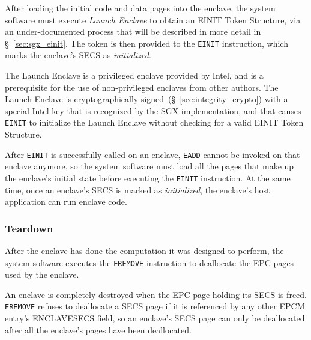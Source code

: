 
After loading the initial code and data pages into the enclave, the system
software must execute \textit{Launch Enclave} to obtain an EINIT Token
Structure, via an under-documented process that will be described in more
detail in \S~\ref{sec:sgx_einit}. The token is then provided to the
\texttt{EINIT} instruction, which marks the enclave's SECS as
\textit{initialized}.

The Launch Enclave is a privileged enclave provided by Intel, and is a
prerequisite for the use of non-privileged enclaves from other authors. The
Launch Enclave is cryptographically signed~(\S~\ref{sec:integrity_crypto}) with
a special Intel key that is recognized by the SGX implementation, and that
causes \texttt{EINIT} to initialize the Launch Enclave without checking for
a valid EINIT Token Structure.

After \texttt{EINIT} is successfully called on an enclave, \texttt{EADD} cannot
be invoked on that enclave anymore, so the system software must load all the
pages that make up the enclave's initial state before executing the
\texttt{EINIT} instruction. At the same time, once an enclave's SECS is marked
as \textit{initialized}, the enclave's host application can run enclave code.


\subsubsection{Teardown}
\label{sec:sgx_eremove}

After the enclave has done the computation it was designed to perform, the
system software executes the \texttt{EREMOVE} instruction to deallocate the
EPC pages used by the enclave.

An enclave is completely destroyed when the EPC page holding its SECS is freed.
\texttt{EREMOVE} refuses to deallocate a SECS page if it is referenced by any
other EPCM entry's ENCLAVESECS field, so an enclave's SECS page can only be
deallocated after all the enclave's pages have been deallocated.
